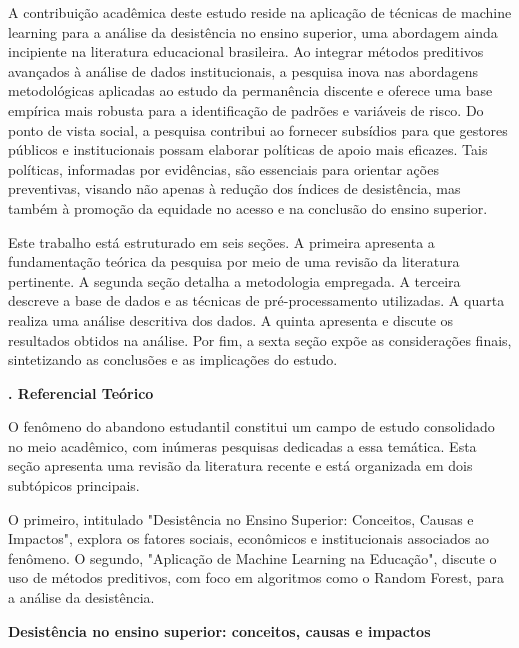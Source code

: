 \newpage

A contribuição acadêmica deste estudo reside na aplicação de técnicas de machine learning para a análise da desistência no ensino superior, uma abordagem ainda incipiente na literatura educacional brasileira. Ao integrar métodos preditivos avançados à análise de dados institucionais, a pesquisa inova nas abordagens metodológicas aplicadas ao estudo da permanência discente e oferece uma base empírica mais robusta para a identificação de padrões e variáveis de risco. Do ponto de vista social, a pesquisa contribui ao fornecer subsídios para que gestores públicos e institucionais possam elaborar políticas de apoio mais eficazes. Tais políticas, informadas por evidências, são essenciais para orientar ações preventivas, visando não apenas à redução dos índices de desistência, mas também à promoção da equidade no acesso e na conclusão do ensino superior.

Este trabalho está estruturado em seis seções. A primeira apresenta a fundamentação teórica da pesquisa por meio de uma revisão da literatura pertinente. A segunda seção detalha a metodologia empregada. A terceira descreve a base de dados e as técnicas de pré-processamento utilizadas. A quarta realiza uma análise descritiva dos dados. A quinta apresenta e discute os resultados obtidos na análise. Por fim, a sexta seção expõe as considerações finais, sintetizando as conclusões e as implicações do estudo.

\vspace{2em}
\noindent\textbf{\themanualchapter. Referencial Teórico}
\vspace{1em}
\par

O fenômeno do abandono estudantil constitui um campo de estudo consolidado no meio acadêmico, com inúmeras pesquisas dedicadas a essa temática. Esta seção apresenta uma revisão da literatura recente e está organizada em dois subtópicos principais.

O primeiro, intitulado "Desistência no Ensino Superior: Conceitos, Causas e Impactos", explora os fatores sociais, econômicos e institucionais associados ao fenômeno. O segundo, "Aplicação de Machine Learning na Educação", discute o uso de métodos preditivos, com foco em algoritmos como o Random Forest, para a análise da desistência.

\vspace{1.5em}
\noindent\textbf{\themanualsection\hspace{1em}Desistência no ensino superior: conceitos, causas e impactos}
\vspace{0.5em}
\par

